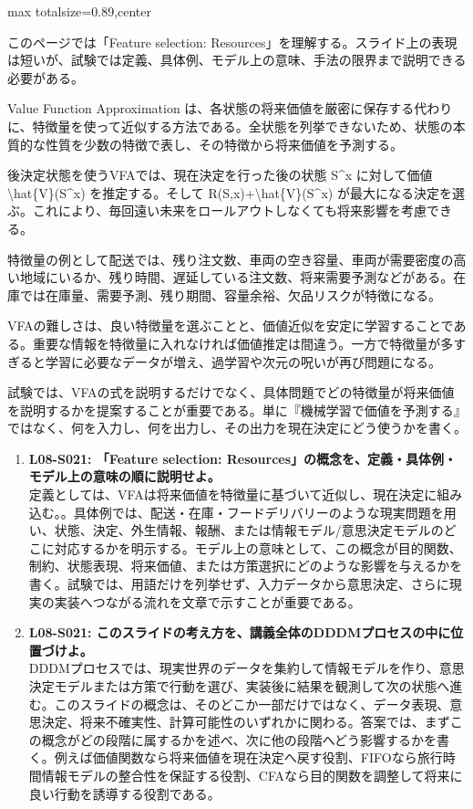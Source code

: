 \begin{minipage}[t]{0.58\textwidth}
\begin{adjustbox}{max totalsize={\textwidth}{0.89\textheight},center}
\begin{minipage}{\textwidth}\scriptsize
{}このページでは「Feature selection: Resources」を理解する。スライド上の表現は短いが、試験では定義、具体例、モデル上の意味、手法の限界まで説明できる必要がある。\par
Value Function Approximation は、各状態の将来価値を厳密に保存する代わりに、特徴量を使って近似する方法である。全状態を列挙できないため、状態の本質的な性質を少数の特徴で表し、その特徴から将来価値を予測する。\par
後決定状態を使うVFAでは、現在決定を行った後の状態 S\textasciicircum{}x に対して価値 \textbackslash{}hat\{V\}(S\textasciicircum{}x) を推定する。そして R(S,x)+\textbackslash{}hat\{V\}(S\textasciicircum{}x) が最大になる決定を選ぶ。これにより、毎回遠い未来をロールアウトしなくても将来影響を考慮できる。\par
特徴量の例として配送では、残り注文数、車両の空き容量、車両が需要密度の高い地域にいるか、残り時間、遅延している注文数、将来需要予測などがある。在庫では在庫量、需要予測、残り期間、容量余裕、欠品リスクが特徴になる。\par
VFAの難しさは、良い特徴量を選ぶことと、価値近似を安定に学習することである。重要な情報を特徴量に入れなければ価値推定は間違う。一方で特徴量が多すぎると学習に必要なデータが増え、過学習や次元の呪いが再び問題になる。\par
試験では、VFAの式を説明するだけでなく、具体問題でどの特徴量が将来価値を説明するかを提案することが重要である。単に『機械学習で価値を予測する』ではなく、何を入力し、何を出力し、その出力を現在決定にどう使うかを書く。\par{}\begin{enumerate}\item \textbf{L08-S021: 「Feature selection: Resources」の概念を、定義・具体例・モデル上の意味の順に説明せよ。}\\定義としては、VFAは将来価値を特徴量に基づいて近似し、現在決定に組み込む。。具体例では、配送・在庫・フードデリバリーのような現実問題を用い、状態、決定、外生情報、報酬、または情報モデル/意思決定モデルのどこに対応するかを明示する。モデル上の意味として、この概念が目的関数、制約、状態表現、将来価値、または方策選択にどのような影響を与えるかを書く。試験では、用語だけを列挙せず、入力データから意思決定、さらに現実の実装へつながる流れを文章で示すことが重要である。\item \textbf{L08-S021: このスライドの考え方を、講義全体のDDDMプロセスの中に位置づけよ。}\\DDDMプロセスでは、現実世界のデータを集約して情報モデルを作り、意思決定モデルまたは方策で行動を選び、実装後に結果を観測して次の状態へ進む。このスライドの概念は、そのどこか一部だけではなく、データ表現、意思決定、将来不確実性、計算可能性のいずれかに関わる。答案では、まずこの概念がどの段階に属するかを述べ、次に他の段階へどう影響するかを書く。例えば価値関数なら将来価値を現在決定へ戻す役割、FIFOなら旅行時間情報モデルの整合性を保証する役割、CFAなら目的関数を調整して将来に良い行動を誘導する役割である。\end{enumerate}

\end{minipage}
\end{adjustbox}
\end{minipage}
